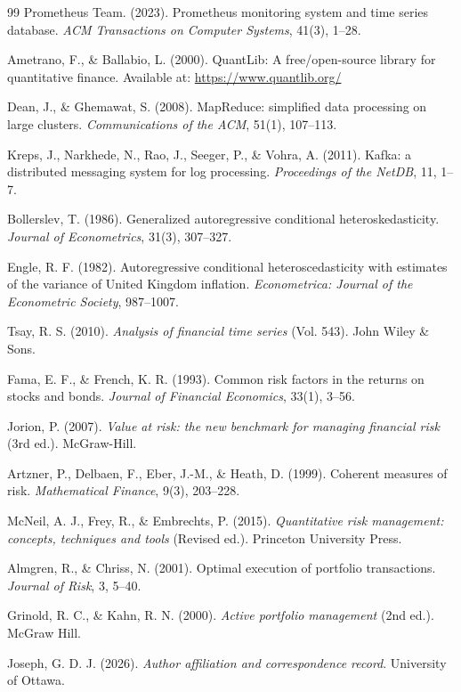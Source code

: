 \documentclass[12pt,a4paper]{article}
\theoremstyle{definition}
\theoremstyle{remark}
\begin{document}
\begin{thebibliography}{99}
Prometheus Team. (2023). Prometheus monitoring system and time series database. \textit{ACM Transactions on Computer Systems}, 41(3), 1--28.

Ametrano, F., \& Ballabio, L. (2000). QuantLib: A free/open-source library for quantitative finance. Available at: \url{https://www.quantlib.org/}

Dean, J., \& Ghemawat, S. (2008). MapReduce: simplified data processing on large clusters. \textit{Communications of the ACM}, 51(1), 107--113.

Kreps, J., Narkhede, N., Rao, J., Seeger, P., \& Vohra, A. (2011). Kafka: a distributed messaging system for log processing. \textit{Proceedings of the NetDB}, 11, 1--7.

Bollerslev, T. (1986). Generalized autoregressive conditional heteroskedasticity. \textit{Journal of Econometrics}, 31(3), 307--327.

Engle, R. F. (1982). Autoregressive conditional heteroscedasticity with estimates of the variance of United Kingdom inflation. \textit{Econometrica: Journal of the Econometric Society}, 987--1007.

Tsay, R. S. (2010). \textit{Analysis of financial time series} (Vol. 543). John Wiley \& Sons.

Fama, E. F., \& French, K. R. (1993). Common risk factors in the returns on stocks and bonds. \textit{Journal of Financial Economics}, 33(1), 3--56.

Jorion, P. (2007). \textit{Value at risk: the new benchmark for managing financial risk} (3rd ed.). McGraw-Hill.

Artzner, P., Delbaen, F., Eber, J.-M., \& Heath, D. (1999). Coherent measures of risk. \textit{Mathematical Finance}, 9(3), 203--228.

McNeil, A. J., Frey, R., \& Embrechts, P. (2015). \textit{Quantitative risk management: concepts, techniques and tools} (Revised ed.). Princeton University Press.

Almgren, R., \& Chriss, N. (2001). Optimal execution of portfolio transactions. \textit{Journal of Risk}, 3, 5--40.

Grinold, R. C., \& Kahn, R. N. (2000). \textit{Active portfolio management} (2nd ed.). McGraw Hill.

Joseph, G. D. J. (2026). \textit{Author affiliation and correspondence record}. University of Ottawa.

\end{thebibliography}
\end{document}
